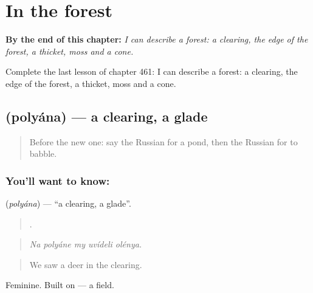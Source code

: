 
\chapter{In the forest}
\label{ch:ru-in-the-forest}

\begin{chapteropening}
\textbf{By the end of this chapter:} \emph{I can describe a forest: a clearing, the edge of the forest, a thicket, moss and a cone.}

Complete the last lesson of chapter 461: I can describe a forest: a clearing, the edge of the forest, a thicket, moss and a cone.
\end{chapteropening}

\section[\texorpdfstring{\ru{поляна} (polyána)}{поляна (polyána)}]{ (polyána) — a clearing, a glade}

\label{lesson:RU-C461-polyana}



\begin{quote}
Before the new one: say the Russian for a pond, then the Russian for to babble.
\end{quote}

\subsection*{You'll want to know: }
\textbf{} (\emph{polyána}) — \textquotedblleft{}a clearing, a glade\textquotedblright{}.

\begin{quote}
    .
\end{quote}

\begin{quote}
\emph{Na polyáne my uvídeli olénya.}
\end{quote}

\begin{quote}
We saw a deer in the clearing.
\end{quote}

Feminine. Built on \emph{} — a field.

